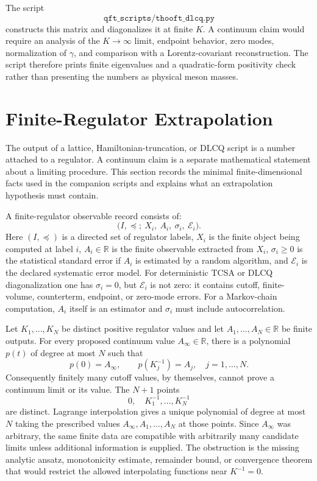 The script
\[
  \texttt{qft\_scripts/thooft\_dlcq.py}
\]
constructs this matrix and diagonalizes it at finite \(K\).  A continuum
claim would require an analysis of the \(K\to\infty\) limit, endpoint
behavior, zero modes, normalization of \(\gamma\), and comparison with a
Lorentz-covariant reconstruction.  The script therefore prints finite
eigenvalues and a quadratic-form positivity check rather than presenting the
numbers as physical meson masses.

\section{Finite-Regulator Extrapolation}
\label{sec:finite-regulator-extrapolation}

The output of a lattice, Hamiltonian-truncation, or DLCQ script is a number
attached to a regulator.  A continuum claim is a separate mathematical
statement about a limiting procedure.  This section records the minimal
finite-dimensional facts used in the companion scripts and explains what an
extrapolation hypothesis must contain.

\begin{definition}
\label{def:finite-regulator-observable-datum}
A finite-regulator observable record consists of:
\[
  \bigl(I,\preceq;\ X_i,\ A_i,\ \sigma_i,\ \mathcal E_i\bigr) .
\]
Here \((I,\preceq)\) is a directed set of regulator labels, \(X_i\) is the
finite object being computed at label \(i\), \(A_i\in\mathbb R\) is the
finite observable extracted from \(X_i\), \(\sigma_i\ge0\) is the statistical
standard error if \(A_i\) is estimated by a random algorithm, and
\(\mathcal E_i\) is the declared systematic error model.  For deterministic
TCSA or DLCQ diagonalization one has \(\sigma_i=0\), but \(\mathcal E_i\) is
not zero: it contains cutoff, finite-volume, counterterm, endpoint, or
zero-mode errors.  For a Markov-chain computation, \(A_i\) itself is an
estimator and \(\sigma_i\) must include autocorrelation.
\end{definition}

\begin{remark}
\label{rem:finite-data-do-not-determine-continuum-limit}
Let \(K_1,\ldots,K_N\) be distinct positive regulator values and let
\(A_1,\ldots,A_N\in\mathbb R\) be finite outputs.  For every proposed
continuum value \(A_\infty\in\mathbb R\), there is a polynomial \(p(t)\) of
degree at most \(N\) such that
\[
  p(0)=A_\infty,
  \qquad
  p(K_j^{-1})=A_j,\quad j=1,\ldots,N .
\]
Consequently finitely many cutoff values, by themselves, cannot prove a
continuum limit or its value.
The \(N+1\) points
\[
  0,\quad K_1^{-1},\ldots,K_N^{-1}
\]
are distinct.  Lagrange interpolation gives a unique polynomial of degree at
most \(N\) taking the prescribed values \(A_\infty,A_1,\ldots,A_N\) at those
points.  Since \(A_\infty\) was arbitrary, the same finite data are
compatible with arbitrarily many candidate limits unless additional
information is supplied.  The obstruction is the missing analytic ansatz,
monotonicity estimate, remainder bound, or convergence theorem that would
restrict the allowed interpolating functions near \(K^{-1}=0\).
\end{remark}

